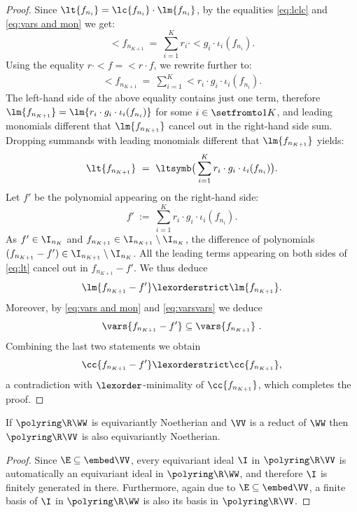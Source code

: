 \begin{proof}
%
Since $\lt{f_{n_{i}}}  = 
\lc{f_{n_{i}}} \cdot \lm{f_{n_{i}}}$,
by the equalities \eqref{eq:lclc} and \eqref{eq:vars and mon}  we get:
\[
\lt{f_{n_{K+1}}} \ = \ 
\sum_{i = 1}^K r_i \cdot \lt{g_i \cdot \iota_i(f_{n_i})}.
\]
Using the equality $r \cdot \lt{f} = \lt{r \cdot f}$, 
we rewrite further to:
%
\begin{align*}%
\lt{f_{n_{K+1}}} \ = \ 
\sum_{i = 1}^K \lt{ r_i \cdot g_i \cdot \iota_i(f_{n_i})}.
\end{align*}
%
The left-hand side of the above equality contains just one term,
therefore $\lm{f_{n_{K+1}}} = \lm{ r_i \cdot g_i \cdot \iota_i(f_{n_i})}$ for some $i\in\setfromto 1 K$,
and leading monomials different that $\lm{f_{n_{K+1}}}$ cancel out in the right-hand side sum.
Dropping summands with leading monomials different that $\lm{f_{n_{K+1}}}$ yields: 
%
\begin{align}\label{eq:lt}
\lt{f_{n_{K+1}}} \ = \ 
\ltsymb\big(\sum_{i = 1}^K r_i \cdot g_i \cdot \iota_i(f_{n_i})\big).
\end{align}
%
Let $f'$ be the polynomial appearing on the right-hand side:
\[
f' \ := \ \sum_{i = 1}^K r_i \cdot g_i \cdot \iota_i(f_{n_i}).
\]
As $f' \in \I_{n_K}$ and $f_{n_{K+1}} \in \I_{n_{K+1}} \setminus \I_{n_K}$,
the difference of polynomials
$(f_{n_{K+1}} - f') \in \I_{n_{K+1}} \setminus \I_{n_K}$.
All the leading terms appearing on both sides of
\eqref{eq:lt} cancel out in $f_{n_{K+1}} - f'$.
We thus deduce 
\[
\lm {f_{n_{K+1}} - f'} \lexorderstrict \lm{f_{n_{K+1}}}.
\]
Moreover, by \eqref{eq:vars and mon} and \eqref{eq:varsvars} we deduce
\[
\vars{f_{n_{K+1}} - f'} \subseteq \vars{f_{n_{K+1}}} \ .
\]
Combining the last two statements we obtain
\[
\cc {f_{n_{K+1}} - f'} \lexorderstrict \cc{f_{n_{K+1}}},
\]
a contradiction with $\lexorder$-minimality of $\cc{f_{n_{K+1}}}$, which completes the proof.
\end{proof}

\begin{lemma}\label{lem:equiv noeth}
If $\polyring \R \WW$ is equivariantly Noetherian and $\VV$ is a reduct of $\WW$ then
$\polyring \R \VV$ is also equivariantly Noetherian.
\end{lemma}
%
\begin{proof}
Since $\E \subseteq \embed \VV$, 
every equivariant ideal $\I$ in $\polyring \R \VV$ is automatically an equivariant ideal
in $\polyring \R \WW$, and therefore
$\I$  is finitely generated in there.
Furthermore, again due to $\E \subseteq \embed \VV$, a finite basis of $\I$ 
in $\polyring \R \WW$ 
is also its basis in $\polyring \R \VV$.
\end{proof}

